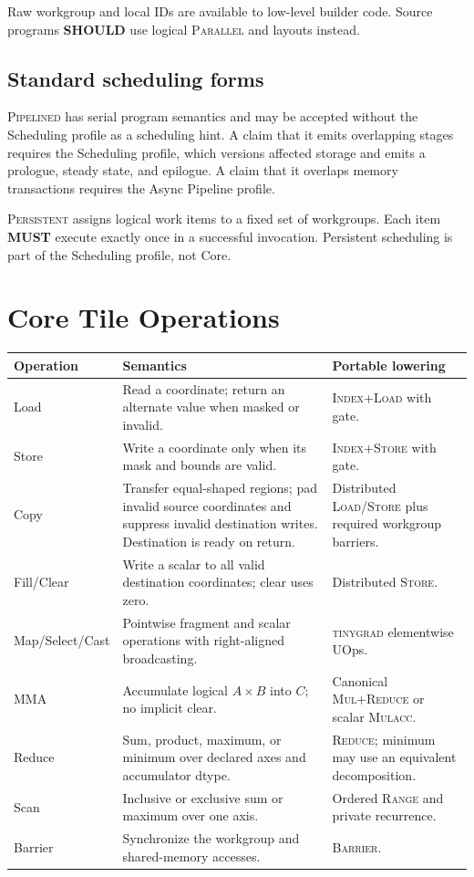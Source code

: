 \documentclass[10pt,letterpaper]{article}
\newcommand{\tinygrad}{\textsc{tinygrad}}
\newcommand{\op}[1]{\textsc{#1}}
\newcommand{\must}{\textbf{MUST}}
\newcommand{\should}{\textbf{SHOULD}}
\begin{document}
Raw workgroup and local IDs are available to low-level builder code. Source
programs \should{} use logical \op{Parallel} and layouts instead.

\subsection*{Standard scheduling forms}

\op{Pipelined} has serial program semantics and may be accepted without the
Scheduling profile as a scheduling hint. A claim that it emits overlapping
stages requires the Scheduling profile, which versions affected storage and
emits a prologue, steady state, and epilogue. A claim that it overlaps memory
transactions requires the Async Pipeline profile.

\op{Persistent} assigns logical work items to a fixed set of workgroups. Each
item \must{} execute exactly once in a successful invocation. Persistent scheduling
is part of the Scheduling profile, not Core.

\section*{Core Tile Operations}

\begin{center}
\begin{tabularx}{\textwidth}{@{}lYY@{}}
\toprule
\textbf{Operation} & \textbf{Semantics} & \textbf{Portable lowering} \\
\midrule
Load & Read a coordinate; return an alternate value when masked or invalid. &
\op{Index}+\op{Load} with gate. \\
Store & Write a coordinate only when its mask and bounds are valid. &
\op{Index}+\op{Store} with gate. \\
Copy & Transfer equal-shaped regions; pad invalid source coordinates and
suppress invalid destination writes. Destination is ready on return. &
Distributed \op{Load}/\op{Store} plus required workgroup barriers. \\
Fill/Clear & Write a scalar to all valid destination coordinates; clear uses
zero. & Distributed \op{Store}. \\
Map/Select/Cast & Pointwise fragment and scalar operations with right-aligned
broadcasting. & \tinygrad{} elementwise UOps. \\
MMA & Accumulate logical $A\times B$ into $C$; no implicit clear. & Canonical
\op{Mul}+\op{Reduce} or scalar \op{Mulacc}. \\
Reduce & Sum, product, maximum, or minimum over declared axes and accumulator
dtype. & \op{Reduce}; minimum may use an equivalent decomposition. \\
Scan & Inclusive or exclusive sum or maximum over one axis. & Ordered
\op{Range} and private recurrence. \\
Barrier & Synchronize the workgroup and shared-memory accesses. &
\op{Barrier}. \\
\bottomrule
\end{tabularx}
\end{center}
\end{document}
